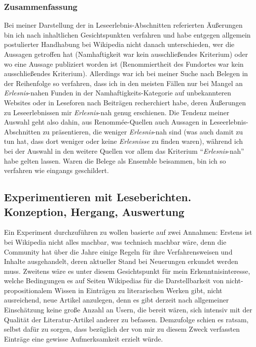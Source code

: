 \documentclass[fontsize=12pt]{scrartcl}
\begin{document}
\subsubsection{Zusammenfassung}
\label{subsubsec:6.1.13}

Bei meiner Darstellung der in Leseerlebnis-Abschnitten referierten \"Au{\ss}erungen bin ich nach inhaltlichen Gesichtspunkten verfahren und habe entgegen allgemein postulierter Handhabung bei Wi\-ki\-pe\-dia nicht danach unterschieden, wer die Aussagen getroffen hat (Namhaftigkeit war kein ausschlie{\ss}endes Kriterium) oder wo eine Aussage pu\-bli\-ziert worden ist (Renommiertheit des Fundortes war kein ausschlie{\ss}endes Kriterium). Al\-ler\-dings war ich bei meiner Suche nach Belegen in der Reihenfolge so verfahren, dass ich in den meisten F\"allen nur bei Mangel an \textit{Erlesnis}-nahen Funden in der Namhaftigkeits-Kategorie auf unbekannteren Websites oder in Leseforen nach Beitr\"agen recherchiert habe, deren \"Au{\ss}erungen zu Leseerlebnissen mir \textit{Erlesnis}-nah genug erschienen. Die Tendenz meiner Auswahl geht also dahin, aus Renomm\'{e}e-Quellen auch Aussagen in Leseerlebnis-Abschnitten zu pr\"asentieren, die weniger \textit{Erlesnis}-nah sind (was auch damit zu tun hat, dass dort weniger oder keine \textit{Erlesnisse} zu finden waren), w\"ahrend ich bei der Auswahl in den weitere Quellen vor allem das Kriterium "`\textit{Erlesnis}-nah"' habe gelten lassen. Waren die Belege als Ensemble beisammen, bin ich so verfahren wie eingangs geschildert.

\pagebreak
\subsection{Experimentieren mit Leseberichten. Konzeption, Hergang, Auswertung}
\label{subsec:6.2}

Ein Experiment durchzuf\"uhren zu wollen basierte auf zwei Annahmen: Erstens ist bei Wi\-ki\-pe\-dia nicht alles machbar, was technisch machbar w\"are, denn die Community hat \"uber die Jahre einige Regeln f\"ur ihre Verfahrensweisen und Inhalte ausgehandelt, deren aktueller Stand bei Neuerungen erkundet werden muss. Zwei\-tens w\"are es unter diesem Gesichtspunkt f\"ur mein Erkenntnisinteresse, welche Bedingungen es auf Sei\-ten Wi\-ki\-pe\-dias f\"ur die Darstellbarkeit von nicht-pro\-po\-si\-ti\-o\-na\-lem Wissen in Eintr\"agen zu li\-te\-ra\-rischen Werken gibt, nicht ausreichend, neue Artikel anzulegen, denn es gibt derzeit nach allgemeiner Einsch\"atzung keine gro{\ss}e Anzahl an Usern, die bereit w\"aren, sich intensiv mit der Qualit\"at der Li\-te\-ra\-tur-Artikel an\-de\-rer zu befassen. Demzufolge schien es ratsam, \mbox{selbst} daf\"ur zu sorgen, dass bez\"uglich der von mir zu diesem Zweck verfassten Eintr\"age eine gewisse Aufmerksamkeit erzielt w\"urde.
\end{document}

